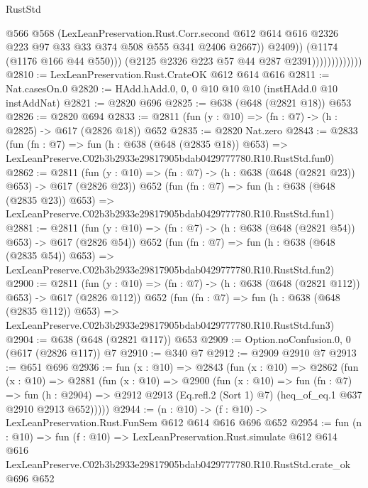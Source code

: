 \begin{lexlean}{RustStd}
\begin{coremodule}
                                    @566
                                    @568
                                    (LexLeanPreservation.Rust.Corr.second
                                      @612
                                      @614
                                      @616
                                      @2326
                                      @223
                                      @97
                                      @33
                                      @33
                                      @374
                                      @508
                                      @555
                                      @341
                                      @2406
                                      @2667))
                                  @2409))
                              (@1174 (@1176 @166 @44 @550)))
                            (@2125 @2326 @223 @57 @44 @287 @2391)))))))))))))
@2810 := LexLeanPreservation.Rust.CrateOK @612 @614 @616
@2811 := Nat.casesOn.{0}
@2820 := HAdd.hAdd.{0, 0, 0} @10 @10 @10 (instHAdd.{0} @10 instAddNat)
@2821 := @2820 @696
@2825 := @638 (@648 (@2821 @18)) @653
@2826 := @2820 @694
@2833 := @2811 (fun (y : @10) => (fn : @7) -> (h : @2825) -> @617 (@2826 @18)) @652
@2835 := @2820 Nat.zero
@2843 := @2833
    (fun (fn : @7) =>
    fun (h : @638 (@648 (@2835 @18)) @653) =>
    LexLeanPreserve.C02b3b2933e29817905bdab0429777780.R10.RustStd.fun0)
@2862 := @2811
    (fun (y : @10) => (fn : @7) -> (h : @638 (@648 (@2821 @23)) @653) -> @617 (@2826 @23))
    @652
    (fun (fn : @7) =>
    fun (h : @638 (@648 (@2835 @23)) @653) =>
    LexLeanPreserve.C02b3b2933e29817905bdab0429777780.R10.RustStd.fun1)
@2881 := @2811
    (fun (y : @10) => (fn : @7) -> (h : @638 (@648 (@2821 @54)) @653) -> @617 (@2826 @54))
    @652
    (fun (fn : @7) =>
    fun (h : @638 (@648 (@2835 @54)) @653) =>
    LexLeanPreserve.C02b3b2933e29817905bdab0429777780.R10.RustStd.fun2)
@2900 := @2811
    (fun (y : @10) => (fn : @7) -> (h : @638 (@648 (@2821 @112)) @653) -> @617 (@2826 @112))
    @652
    (fun (fn : @7) =>
    fun (h : @638 (@648 (@2835 @112)) @653) =>
    LexLeanPreserve.C02b3b2933e29817905bdab0429777780.R10.RustStd.fun3)
@2904 := @638 (@648 (@2821 @117)) @653
@2909 := Option.noConfusion.{0, 0} (@617 (@2826 @117)) @7
@2910 := @340 @7
@2912 := @2909 @2910 @7
@2913 := @651 @696
@2936 := fun (x : @10) =>
  @2843
    (fun (x : @10) =>
    @2862
      (fun (x : @10) =>
      @2881
        (fun (x : @10) =>
        @2900
          (fun (x : @10) =>
          fun (fn : @7) =>
          fun (h : @2904) =>
          @2912 @2913 (Eq.refl.{2} (Sort 1) @7) (heq_of_eq.{1} @637 @2910 @2913 @652)))))
@2944 := (n : @10) -> (f : @10) -> LexLeanPreservation.Rust.FunSem @612 @614 @616 @696 @652
@2954 := fun (n : @10) =>
  fun (f : @10) =>
  LexLeanPreservation.Rust.simulate
    @612
    @614
    @616
    LexLeanPreserve.C02b3b2933e29817905bdab0429777780.R10.RustStd.crate_ok
    @696
    @652
\end{coremodule}
\end{lexlean}
